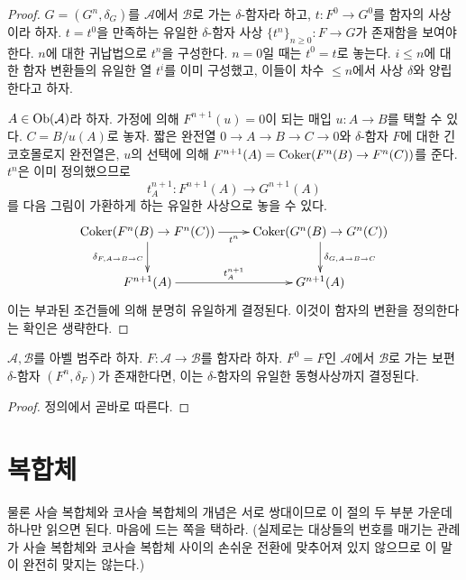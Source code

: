 \begin{proof}
$G = (G^n, \delta_G)$를 $\mathcal{A}$에서 $\mathcal{B}$로 가는
$\delta$-함자라 하고, $t : F^0 \to G^0$를 함자의 사상이라 하자.
$t = t^0$을 만족하는 유일한 $\delta$-함자 사상
$\{t^n\}_{n \geq 0} : F \to G$가 존재함을 보여야 한다.
$n$에 대한 귀납법으로 $t^n$을 구성한다.
$n = 0$일 때는 $t^0 = t$로 놓는다.
$i \leq n$에 대한 함자 변환들의 유일한 열 $t^i$를 이미 구성했고,
이들이 차수 $\leq n$에서 사상 $\delta$와 양립한다고 하자.

\medskip\noindent
$A \in \mathop{\mathrm{Ob}}\nolimits(\mathcal{A})$라 하자. 가정에 의해
$F^{n + 1}(u) = 0$이 되는 매입 $u : A \to B$를 택할 수 있다.
$C = B/u(A)$로 놓자. 짧은 완전열
$0 \to A \to B \to C \to 0$와 $\delta$-함자 $F$에 대한 긴
코호몰로지 완전열은, $u$의 선택에 의해
$F^{n + 1}(A) = \mathop{\mathrm{Coker}}(F^n(B) \to F^n(C))$를 준다.
$t^n$은 이미 정의했으므로
$$
t^{n + 1}_A : F^{n + 1}(A) \to G^{n + 1}(A)
$$
를 다음 그림이 가환하게 하는 유일한 사상으로 놓을 수 있다.
$$
\xymatrix{
\Coker(F^n(B) \to F^n(C)) \ar[r]_{t^n}
\ar[d]_{\delta_{F, A \to B \to C}} &
\Coker(G^n(B) \to G^n(C))
\ar[d]^{\delta_{G, A \to B \to C}} \\
F^{n + 1}(A) \ar[r]^{t^{n + 1}_A} &
G^{n + 1}(A)
}
$$
이는 부과된 조건들에 의해 분명히 유일하게 결정된다.
이것이 함자의 변환을 정의한다는 확인은 생략한다.
\end{proof}

\begin{lemma}
\label{lemma-uniqueness-universal-delta-functor}
$\mathcal{A}, \mathcal{B}$를 아벨 범주라 하자.
$F : \mathcal{A} \to \mathcal{B}$를 함자라 하자.
$F^0 = F$인 $\mathcal{A}$에서 $\mathcal{B}$로 가는 보편
$\delta$-함자 $(F^n, \delta_F)$가 존재한다면, 이는
$\delta$-함자의 유일한 동형사상까지 결정된다.
\end{lemma}

\begin{proof}
정의에서 곧바로 따른다.
\end{proof}








\section{복합체}
\label{section-complexes}

\noindent
물론 사슬 복합체와 코사슬 복합체의 개념은 서로 쌍대이므로 이 절의
두 부분 가운데 하나만 읽으면 된다. 마음에 드는 쪽을 택하라.
(실제로는 대상들의 번호를 매기는 관례가 사슬 복합체와 코사슬 복합체
사이의 손쉬운 전환에 맞추어져 있지 않으므로 이 말이 완전히 맞지는
않는다.)

